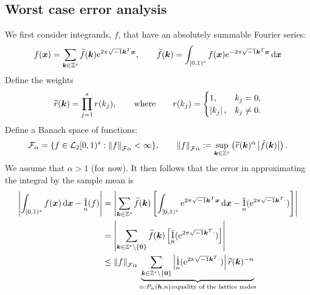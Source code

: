 \documentclass{amsart}
\newcommand{\tr}{\widetilde{r}}
\newcommand{\appxintn}{\appxint_n}
\DeclareMathOperator{\appxint}{\hat{I}}
\begin{document}
\subsection{Worst case error analysis}
We first consider integrands, $f$, that have an absolutely summable Fourier series:
\begin{equation} \label{eq:fseries}
    f(\boldsymbol{x}) = \sum_{\boldsymbol{k} \in \mathbb{Z}^s} \widetilde{f}(\boldsymbol{k}) \mathrm{e}^{2 \pi \sqrt{-1} \boldsymbol{k}^T \boldsymbol{x}}, \qquad \widetilde{f}(\boldsymbol{k}) = \int_{[0,1)^s} f(\boldsymbol{x}) \mathrm{e}^{-2 \pi \sqrt{-1} \boldsymbol{k}^T \boldsymbol{x}}\, {\rm d} \boldsymbol{x}
\end{equation}
Define the weights 
\begin{equation}
\tr(\vk) = \prod_{j=1}^{s} r(k_{j}),
\qquad \text{where} \qquad r(k_{j})=\begin{cases} 1, &
k_{j}=0, \\ \abs{k_{j}}, & k_{j} \ne 0.  \end{cases}
\end{equation}
Define a Banach
space of functions:
$$
\cf_{\alpha} = \{ f \in \cl_2[0,1)^s : 
\norm[\cf{\alpha}]{f} < \infty \}, \qquad
\norm[\cf{\alpha}]{f} := \sup_{\vk \in \integers^{s}}
\left(\tr(\vk)^{\alpha} \abs{\tilde{f}(\vk)} \right).
$$
We assume that $\alpha > 1$ (for now).
It then follows that the error in approximating the integral by the sample mean is
\begin{align}
\abs{\int_{[0,1)^s} f(\vx) \, \dif \vx - \appxint_n(f)} & 
= \abs{\sum_{\vk \in \integers^s} \tf(\vk) \left[\int_{[0,1)^s} \me^{2 \pi \sqrt{-1} \vk^T \vx} \, \dif \vx - \appxintn(\me^{2 \pi \sqrt{-1} \vk^T \cdot})\right]} \\
\nonumber
& = \abs{\sum_{\vk \in \integers^s \setminus\{\vzero\}} \tf(\vk) \left[ \appxintn(\me^{2 \pi \sqrt{-1} \vk^T \cdot})\right]} \\
\nonumber
& \le \norm[\cf{\alpha}]{f} \underbrace{\sum_{\vk \in \integers^s \setminus\{\vzero\}} \abs{\appxint_n(\me^{2 \pi \sqrt{-1} \vk^T \cdot})}\tr(\vk)^{-\alpha}}_{=: P_\alpha(\vh,n) = \text{quality of the lattice nodes}} \\
\nonumber
\end{align}
\end{document}
